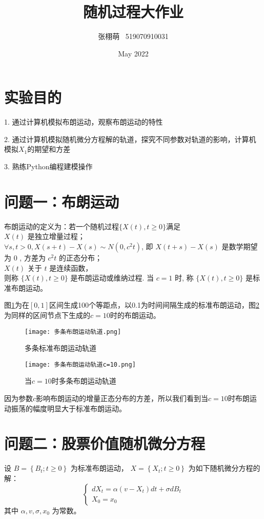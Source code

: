 \documentclass{article}
\title{随机过程大作业}
\author{张栩萌 \ 519070910031}
\date{May 2022}
\begin{document}
\maketitle

\section{实验目的}
1. 通过计算机模拟布朗运动，观察布朗运动的特性

2. 通过计算机模拟随机微分方程解的轨道，探究不同参数对轨道的影响，计算机模拟$X_1$的期望和方差

3. 熟练Python编程建模操作




\section{问题一：布朗运动}
布朗运动的定义为：若一个随机过程$\{X(t), t \ge 0\}$满足\\
$X(t)$ 是独立增量过程；\\
$\forall s, t>0, X(s+t)-X(s) \sim N\left(0, c^{2} t\right)$, 即 $X(t+s)-X(s)$ 是数学期望 为 0 , 方差为 $c^{2} t$ 的正态分布；\\
$X(t)$ 关于 $t$ 是连续函数，\\
则称 $\{X(t), t \ge 0\}$ 是布朗运动或维纳过程. 当 $c=1$ 时, 称 $\{X(t), t \ge 0\}$ 是标准布朗运动。

图\ref{fig:brown1}为在$[0, 1]$区间生成100个等距点，以0.1为时间间隔生成的标准布朗运动，图\ref{fig:brown1_10}为同样的区间节点下生成的$c=10$时的布朗运动。

\begin{figure}[H]
    \centering
    \texttt{[image: 多条布朗运动轨道.png]}
    \caption{多条标准布朗运动轨道}
    \label{fig:brown1}
    \end{figure}

\begin{figure}[H]
    \centering
    \texttt{[image: 多条布朗运动轨道c=10.png]}
    \caption{当$c=10$时多条布朗运动轨道}
    \label{fig:brown1_10}
    \end{figure}

因为参数$c$影响布朗运动的增量正态分布的方差，所以我们看到当$c=10$时布朗运动振荡的幅度明显大于标准布朗运动。




\section{问题二：股票价值随机微分方程}
设 $B=\left\{B_{t} ; t \geq 0\right\}$ 为标准布朗运动， $X=\left\{X_{t} ; t \geq 0\right\}$ 为如下随机微分方程的解：
$$
\left\{\begin{array}{l}
d X_{t}=\alpha\left(v-X_{t}\right) d t+\sigma d B_{t} \\
X_{0}=x_{0}
\end{array}\right.
$$
其中 $\alpha, v, \sigma, x_{0}$ 为常数。
\end{document}
